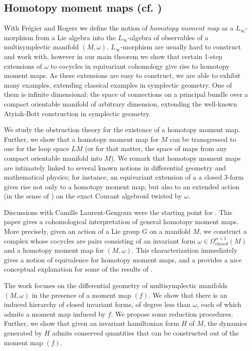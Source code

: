 \documentclass[11pt]{amsart}
\begin{document}
\subsection{Homotopy moment maps    (cf. \cite{FRZ}\cite{FLRZ}\cite{Cons})}
With Fr\'egier and Rogers  \cite{FRZ} we define the notion of \emph{homotopy moment map} as 
a $L_{\infty}$-morphism from a Lie algebra into the $L_{\infty}$-algebra of observables of a multisymplectic manifold $(M,\omega)$. $L_{\infty}$-morphism are usually hard to construct and work with, however in 
our main theorem we show that certain 1-step extensions of $\omega$ to cocycles in equivariant cohomology give rise to homotopy moment maps. As these extensions are easy to construct, we are able to exhibit many examples, extending classical examples in symplectic geometry. One of them is infinite dimensional:  the space of connections on a principal bundle over a compact orientable manifold of arbitrary dimension, extending the well-known Atyiah-Bott construction in symplectic geometry. 
 
 We study the obstruction theory for the existence of a homotopy moment map. Further, we show that a homotopy moment map for $M$ can be transgressed to one for the loop space $LM$ (or for that matter, the space of maps from any compact orientable manifold into $M$). We remark that homotopy moment maps are intimately linked to several known notions in differential geometry and mathematical physics; for instance, an equivariant extension of a 
a closed 3-form gives rise not only to a homotopy moment map, but also to an extended action (in the sense of \cite{BCG}) on the exact Courant algebroid twisted by $\omega$.
 


Discussions  with Camille Laurent-Gengoux were the starting point for  \cite{FLRZ}. This paper gives a  cohomological interpretation  of general homotopy moment maps. More precisely, given an action of a Lie group $G$ on a manifold $M$, we construct a complex whose cocycles are pairs consisting of an invariant  form $\omega\in \Omega^{n+1}_{closed}(M)$ and a homotopy moment map for $(M,\omega)$. This characterization immediately gives a notion of equivalence for homotopy moment maps, and a provides a nice conceptual explanation for some of the results of \cite{FRZ}. 

The work \cite{Cons} focuses on the differential geometry of multisymplectic manifolds $(M,\omega)$ in the presence of a moment map $(f)$. We show that there is an induced hierarchy of closed invariant forms, of degree less than $\omega$, each of which admits a  moment map induced by $f$. We propose some reduction procedures. Further, we show that given an invariant hamiltonian form $H$ of $M$, the dynamics generated by $H$ admits   conserved quantities that can be constructed out of the moment map $(f)$. 
\end{document}
